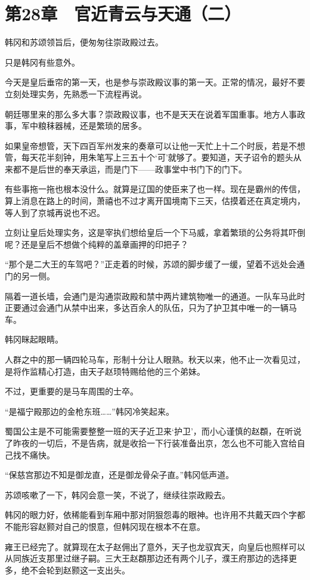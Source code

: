 \section{第28章　官近青云与天通（二）}

韩冈和苏颂领旨后，便匆匆往崇政殿过去。

只是韩冈有些意外。

今天是皇后垂帘的第一天，也是参与崇政殿议事的第一天。正常的情况，最好不要立刻处理实务，先熟悉一下流程再说。

朝廷哪里来的那么多大事？崇政殿议事，也不是天天在说着军国重事。地方人事政事，军中粮秣器械，还是繁琐的居多。

如果皇帝想管，天下四百军州发来的奏章可以让他一天忙上十二个时辰，若是不想管，每天花半刻钟，用朱笔写上三五十个‘可’就够了。要知道，天子诏令的题头从来都不是后世的奉天承运，而是门下——政事堂中书门下的门下。

有些事拖一拖也根本没什么。就算是辽国的使臣来了也一样。现在是霸州的传信，算上消息在路上的时间，萧禧也不过才离开国境南下三天，估摸着还在真定境内，等人到了京城再说也不迟。

立刻让皇后处理实务，这是宰执们想给皇后一个下马威，拿着繁琐的公务将其吓倒呢？还是皇后不想做个纯粹的盖章画押的印把子？

“那个是二大王的车驾吧？”正走着的时候，苏颂的脚步缓了一缓，望着不远处会通门的另一侧。

隔着一道长墙，会通门是沟通崇政殿和禁中两片建筑物唯一的通道。一队车马此时正要通过会通门从禁中出来，多达百余人的队伍，只为了护卫其中唯一的一辆马车。

韩冈眯起眼睛。

人群之中的那一辆四轮马车，形制十分让人眼熟。秋天以来，他不止一次看见过，是将作监精心打造，由天子赵顼特赐给他的三个弟妹。

不过，更重要的是马车周围的士卒。

“是福宁殿那边的金枪东班……”韩冈冷笑起来。

蜀国公主是不可能需要整整一班的天子近卫来‘护卫’，而小心谨慎的赵頵，在听说了昨夜的一切后，不是告病，就是收拾一下行装准备出京，怎么也不可能入宫给自己找不痛快。

“保慈宫那边不知是御龙直，还是御龙骨朵子直。”韩冈低声道。

苏颂咳嗽了一下，韩冈会意一笑，不说了，继续往崇政殿去。

韩冈的眼力好，依稀能看到车厢中那对阴狠怨毒的眼神。也许用不共戴天四个字都不能形容赵颢对自己的恨意，但韩冈现在根本不在意。

雍王已经完了。就算现在太子赵佣出了意外，天子也龙驭宾天，向皇后也照样可以从同族近支那里过继子嗣。三大王赵頵那边还有两个儿子，濮王府那边的选择更多，绝不会轮到赵颢这一支出头。

